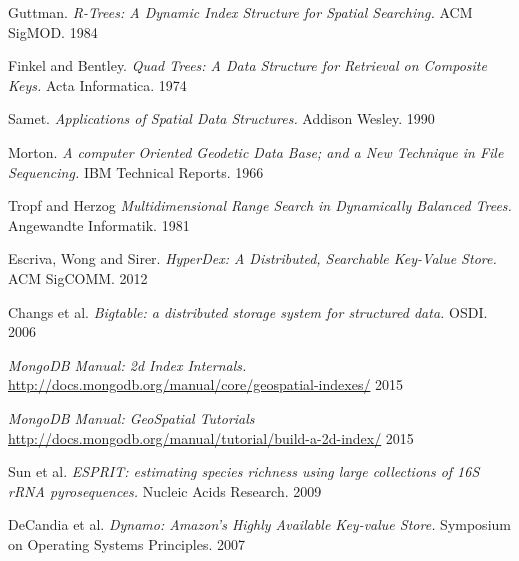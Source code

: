 \documentclass[11pt]{article}
\begin{document}
\begin{thebibliography}{99}

  Guttman.
  \emph{R-Trees: A Dynamic Index Structure for Spatial Searching.}
  ACM SigMOD.
  1984

  Finkel and Bentley.
  \emph{Quad Trees: A Data Structure for Retrieval on Composite Keys.}
  Acta Informatica.
  1974

  Samet.
  \emph{Applications of Spatial Data Structures.}
  Addison Wesley.
  1990

  Morton.
  \emph{A computer Oriented Geodetic Data Base; and a New Technique in File Sequencing.}
  IBM Technical Reports. 
  1966

 Tropf and Herzog
 \emph{Multidimensional Range Search in Dynamically Balanced Trees.}
 Angewandte Informatik.
 1981

  Escriva, Wong and Sirer.
  \emph{HyperDex: A Distributed, Searchable Key-Value Store.}
  ACM SigCOMM.
  2012

  Changs et al.
  \emph{Bigtable: a distributed storage system for structured data.}
  OSDI.
  2006

  \emph{MongoDB Manual: 2d Index Internals.}
  \url{http://docs.mongodb.org/manual/core/geospatial-indexes/}
  2015


  \emph{MongoDB Manual: GeoSpatial Tutorials}
  \url{http://docs.mongodb.org/manual/tutorial/build-a-2d-index/}
  2015

  Sun et al.
  \emph{ESPRIT: estimating species richness using large collections of 16S rRNA pyrosequences.}
  Nucleic Acids Research.
  2009


  DeCandia et al.
  \emph{Dynamo: Amazon’s Highly Available Key-value Store.}
  Symposium on Operating Systems Principles.
  2007


\end{thebibliography}
\end{document}

